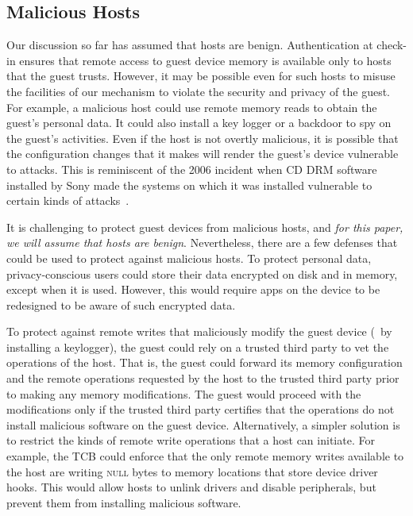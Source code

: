 
\subsection{Malicious Hosts} 
\label{section:usagemodel:malicious}
%
Our discussion so far has assumed that hosts are benign. Authentication at
check-in ensures that remote access to guest device memory is available only to
hosts that the guest trusts. However, it may be possible even for such hosts to
misuse the facilities of our mechanism to violate the security and privacy of
the guest. For example, a malicious host could use remote memory reads to
obtain the guest's personal data. It could also install a key logger or a
backdoor to spy on the guest's activities. Even if the host is not overtly
malicious, it is possible that the configuration changes that it makes will
render the guest's device vulnerable to attacks. This is reminiscent of the
2006 incident when CD DRM software installed by Sony made the systems on which
it was installed vulnerable to certain kinds of attacks~\cite{sonydrm:sec06}.

It is challenging to protect guest devices from malicious hosts, and
\textit{for this paper, we will assume that hosts are benign}. Nevertheless,
there are a few defenses that could be used to protect against malicious hosts.
To protect personal data, privacy-conscious users could store their data
encrypted on disk and in memory, except when it is used. However, this would
require apps on the device to be redesigned to be aware of such encrypted data.

To protect against remote writes that maliciously modify the guest device
(\eg~by installing a keylogger), the guest could rely on a trusted third party
to vet the operations of the host. That is, the guest could forward its memory
configuration and the remote operations requested by the host to the trusted
third party prior to making any memory modifications. The guest would proceed
with the modifications only if the trusted third party certifies that the
operations do not install malicious software on the guest device.
Alternatively, a simpler solution is to restrict the kinds of remote write
operations that a host can initiate. For example, the TCB could enforce that
the only remote memory writes available to the host are writing \textsc{null}
bytes to memory locations that store device driver hooks. This would allow
hosts to unlink drivers and disable peripherals, but prevent them from
installing malicious software.

